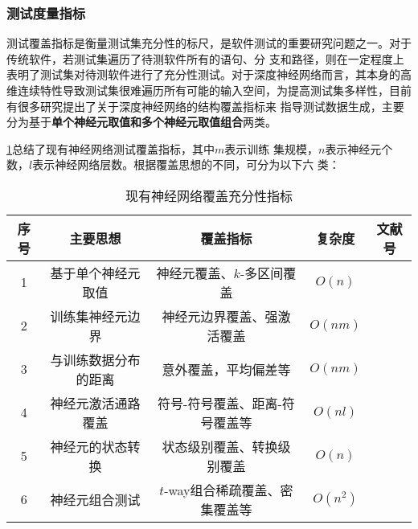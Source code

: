 \subsubsection{测试度量指标}
{测试覆盖指标是衡量测试集充分性的标尺，是软件测试的重要研究问题之一。}对于传统软件，若测试集遍历了待测软件所有的语句、分
支和路径，则在一定程度上表明了测试集对待测软件进行了充分性测试。对于深度神经网络而言，其本身的高
维连续特性导致测试集很难遍历所有可能的输入空间，为提高测试集多样性，目前有很多研究提出了关于深度神经网络的结构覆盖指标来
指导测试数据生成，主要分为基于\textbf{单个神经元取值和多个神经元取值组合}两类。



\iffalse
	\cref{tab:coverage_criteria}总结了现有神经网络测试覆盖指标，其中$m$表示训练
	集规模，$n$表示神经元个数，$l$表示神经网络层数。根据覆盖思想的不同，可分为以下六
	类：

	\begin{table}[htp]
		\renewcommand\arraystretch{1.5}
		\small
		\centering
		\caption{现有神经网络覆盖充分性指标}
		\label{tab:coverage_criteria}
		\begin{tabular}{ccccc}
			\toprule
			\textbf{序号} & \textbf{主要思想}    & \textbf{覆盖指标}               & \textbf{复杂度} & \textbf{文献号}                                \\
			\midrule
			1             & 基于单个神经元取值   & 神经元覆盖、$k$-多区间覆盖      & $O(n)$          & \cite{ma2018deepgauge}\cite{Pei2019DeepXplore} \\
			2             & 训练集神经元边界     & 神经元边界覆盖、强激活覆盖      & $O(nm)$         & \cite{ma2018deepgauge}                         \\
			3             & 与训练数据分布的距离 & 意外覆盖，平均偏差等            & $O(nm)$         & \cite{Kim2019Guiding}\cite{Tian2019Testing}    \\
			4             & 神经元激活通路覆盖   & 符号-符号覆盖、距离-符号覆盖等  & $O(nl)$         & \cite{Wang2019DeepPath}\cite{Sun2018Testing}   \\
			5             & 神经元的状态转换     & 状态级别覆盖、转换级别覆盖      & $O(n)$          & \cite{Du2018DeepCruiser}                       \\
			6             & 神经元组合测试       & $t$-way组合稀疏覆盖、密集覆盖等 & $O(n^2)$        & \cite{ma2019deepct}                            \\
			\bottomrule
		\end{tabular}
	\end{table}

